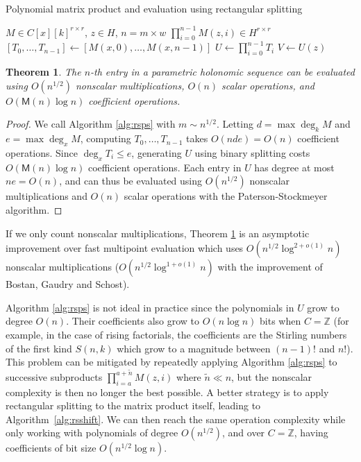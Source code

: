 \documentclass{sig-alternate}
\newtheorem{theorem}{Theorem}
\newcommand   \OO     {O}
\newcommand   \M      {\mathsf{M}}
\begin{document}
\begin{algorithm}
  \caption{Polynomial matrix product and evaluation using rectangular splitting}
  \label{alg:rsps}
  \begin{algorithmic}[1]
    \Require $M \in C[x][k]^{r \times r}$, $z \in H$, $n = m \times w$
    \Ensure $\prod_{i=0}^{n-1} M(z,i) \in H^{r \times r}$
    \State $[T_0, \ldots, T_{n-1}] \gets [M(x,0), \ldots, M(x,n-1)]$
    \Statex {}
    \State $U \gets \prod_{i=0}^{n-1} T_i$ 
    \State $V \gets U(z)$
    \Statex {}
    \State {}
  \end{algorithmic}
\end{algorithm}

\begin{theorem}
The $n$-th entry in a parametric holonomic sequence can be evaluated
using $\OO(n^{1/2})$ nonscalar multiplications, $\OO(n)$ scalar
operations, and $\OO(\M(n) \log n)$ coefficient operations.
\label{propsqrt}
\end{theorem}

\begin{proof}
We call Algorithm \ref{alg:rsps} with $m \sim n^{1/2}$.
Letting $d = \max \deg_k M$ and $e = \max \deg_x M$,
computing $T_0, \ldots, T_{n-1}$
takes $O(nde) = O(n)$ coefficient operations.
Since $\deg_x T_i \le e$, generating $U$
using binary splitting costs
$O(\M(n) \log n)$ coefficient operations.
Each entry in $U$ has degree at most $ne = O(n)$,
and can thus be evaluated using $O(n^{1/2})$
nonscalar multiplications and $O(n)$ scalar operations
with the Paterson-Stockmeyer algorithm.
\end{proof}

If we only count nonscalar multiplications, Theorem \ref{propsqrt}
is an asymptotic improvement over fast multipoint evaluation which
uses $O(n^{1/2} \log^{2+o(1)} n)$ nonscalar multiplications
($O(n^{1/2} \log^{1+o(1)} n)$ with the improvement of
Bostan, Gaudry and Schost).

Algorithm \ref{alg:rsps} is not ideal in practice
since the polynomials in $U$ grow to degree $O(n)$.
Their coefficients also grow
to $O(n \log n)$ bits when $C = \mathbb{Z}$ (for example,
in the case of rising factorials,
the coefficients are the Stirling numbers of the first
kind $S(n,k)$ which grow to a magnitude between $(n-1)!$ and $n!$).
This problem can be mitigated by repeatedly applying Algorithm \ref{alg:rsps}
to successive subproducts $\prod_{i=a}^{a+\tilde n} M(z,i)$ where $\tilde n \ll n$,
but the nonscalar complexity is then no longer the best possible.
A better strategy is to apply
rectangular splitting to the matrix product itself, leading to
Algorithm~\ref{alg:rsshift}.
We can then reach the same operation complexity
while only working with polynomials of degree $O(n^{1/2})$,
and over $C = \mathbb{Z}$, having coefficients of bit size $O(n^{1/2} \log n)$.
\end{document}
